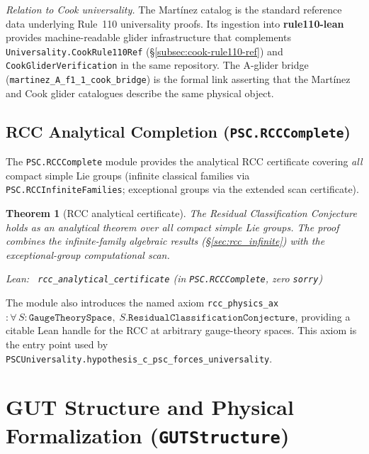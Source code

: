 \documentclass[11pt,a4paper]{article}
\newenvironment{leanref}%
  {\par\smallskip\noindent\begingroup\raggedright\textup{Lean:}~}%
  {\par\endgroup}
\newtheorem{theorem}{Theorem}[section]
\theoremstyle{definition}
\begin{document}
\noindent\textit{Relation to Cook universality.}
The Mart\'{i}nez catalog is the standard reference data underlying Rule~110
universality proofs.  Its ingestion into \textbf{rule110-lean} provides
machine-readable glider infrastructure that complements
\lstinline|Universality.CookRule110Ref| (\S\ref{subsec:cook-rule110-ref})
and \lstinline|CookGliderVerification| in the same repository.
The A-glider bridge (\lstinline|martinez_A_f1_1_cook_bridge|) is the
formal link asserting that the Mart\'{i}nez and Cook glider catalogues
describe the same physical object.

\subsection[RCC Analytical Completion]{RCC Analytical Completion (\texttt{PSC.RCCComplete})}\label{subsec:rcc-complete}

The \texttt{PSC.RCCComplete} module provides the analytical RCC certificate covering
\emph{all} compact simple Lie groups (infinite classical families via
\texttt{PSC.RCCInfiniteFamilies}; exceptional groups via the extended scan certificate).

\begin{theorem}[RCC analytical certificate]\label{thm:rcc-complete}
The Residual Classification Conjecture holds as an analytical theorem over all compact
simple Lie groups.  The proof combines the infinite-family algebraic results
(\S\ref{sec:rcc_infinite}) with the exceptional-group computational scan.

\begin{leanref}
\lstinline|rcc_analytical_certificate|
\textup{(in \texttt{PSC.RCCComplete}, zero \texttt{sorry})}
\end{leanref}
\end{theorem}

The module also introduces the named axiom
\texttt{rcc\_physics\_ax} $: \forall\, S : \mathtt{GaugeTheorySpace},\; S.\mathtt{ResidualClassificationConjecture}$,
providing a citable Lean handle for the RCC at arbitrary gauge-theory spaces.
This axiom is the entry point used by \texttt{PSCUniversality.hypothesis\_c\_psc\_forces\_universality}.

\section[GUT Structure and Physical Formalization]{GUT Structure and Physical Formalization (\texttt{GUTStructure})}\label{sec:gutstructure}
\end{document}
